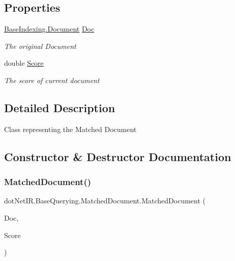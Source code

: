 \subsection*{Properties}
\begin{DoxyCompactItemize}
\item 
\hyperlink{classdot_net_i_r_1_1_base_indexing_1_1_document}{Base\+Indexing.\+Document} \hyperlink{classdot_net_i_r_1_1_base_querying_1_1_matched_document_a7b3f2144f29567c77d2da128e8410c64}{Doc}
\begin{DoxyCompactList}\small\item\em The original Document \end{DoxyCompactList}\item 
double \hyperlink{classdot_net_i_r_1_1_base_querying_1_1_matched_document_ab0c583848eaf13cb7a5d7c7ceb690e80}{Score}
\begin{DoxyCompactList}\small\item\em The score of current document \end{DoxyCompactList}\end{DoxyCompactItemize}


\subsection{Detailed Description}
Class representing the Matched Document 



\subsection{Constructor \& Destructor Documentation}
\hypertarget{classdot_net_i_r_1_1_base_querying_1_1_matched_document_a9b5fc304a8fe2200734cea056a7526f6}{}\label{classdot_net_i_r_1_1_base_querying_1_1_matched_document_a9b5fc304a8fe2200734cea056a7526f6} 
\subsubsection{\texorpdfstring{Matched\+Document()}{MatchedDocument()}}
{\footnotesize\ttfamily dot\+Net\+I\+R.\+Base\+Querying.\+Matched\+Document.\+Matched\+Document (\begin{DoxyParamCaption}\item[{\hyperlink{classdot_net_i_r_1_1_base_indexing_1_1_document}{Base\+Indexing.\+Document}}]{Doc,  }\item[{double}]{Score }\end{DoxyParamCaption})}



